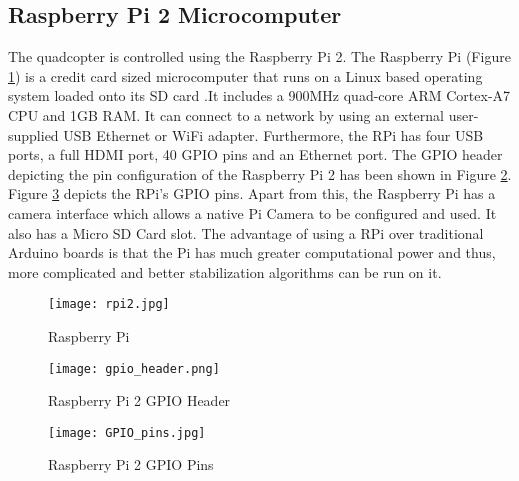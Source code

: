 \subsection{Raspberry Pi 2 Microcomputer}
The quadcopter is controlled using the Raspberry Pi 2. The Raspberry Pi (Figure \ref{RPi}) is a credit card sized microcomputer that runs on a Linux based operating system loaded onto its SD card .\newline It includes a 900MHz quad-core ARM Cortex-A7 CPU and 1GB RAM.
\newline
\newline
It can connect to a network by using an external user-supplied USB Ethernet or WiFi adapter. Furthermore, the RPi has four USB ports, a full HDMI port, 40 GPIO pins and an Ethernet port. The GPIO header depicting the pin configuration of the Raspberry Pi 2 has been shown in Figure \ref{GPIO}. Figure \ref{RPi Pins} depicts the RPi's GPIO pins. Apart from this, the Raspberry Pi has a camera interface which allows a native Pi Camera to be configured and used. It also has a Micro SD Card slot. The advantage of using a RPi over traditional Arduino boards is that the Pi has much greater computational power and thus, more complicated and better stabilization algorithms can be run on it. 

\begin{figure}[H]
  \centering
  \texttt{[image: rpi2.jpg]}
  \caption{Raspberry Pi}
  \label{RPi}	
\end{figure}

\begin{figure}[H]
  \centering
  \texttt{[image: gpio\_header.png]}
  \caption{Raspberry Pi 2 GPIO Header}  \label{GPIO} 
\end{figure}
\begin{figure}[H]
  \centering
  \texttt{[image: GPIO\_pins.jpg]}
  \caption{Raspberry Pi 2 GPIO Pins}
  \label{RPi Pins} 
\end{figure}


